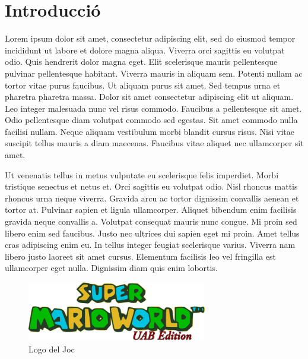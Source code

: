 \section{Introducció}\label{sec:intro}


Lorem ipsum dolor sit amet, consectetur adipiscing elit, sed do eiusmod tempor incididunt ut labore et dolore magna aliqua. Viverra orci sagittis eu volutpat odio. Quis hendrerit dolor magna eget. Elit scelerisque mauris pellentesque pulvinar pellentesque habitant. Viverra mauris in aliquam sem. Potenti nullam ac tortor vitae purus faucibus. Ut aliquam purus sit amet. Sed tempus urna et pharetra pharetra massa. Dolor sit amet consectetur adipiscing elit ut aliquam. Leo integer malesuada nunc vel risus commodo. Faucibus a pellentesque sit amet. Odio pellentesque diam volutpat commodo sed egestas. Sit amet commodo nulla facilisi nullam. Neque aliquam vestibulum morbi blandit cursus risus. Nisi vitae suscipit tellus mauris a diam maecenas. Faucibus vitae aliquet nec ullamcorper sit amet.

Ut venenatis tellus in metus vulputate eu scelerisque felis
imperdiet. Morbi tristique senectus et netus et. Orci sagittis eu
volutpat odio. Nisl rhoncus mattis rhoncus urna neque viverra. Gravida
arcu ac tortor dignissim convallis aenean et tortor at. Pulvinar
sapien et ligula ullamcorper. Aliquet bibendum enim facilisis gravida
neque convallis a. Volutpat consequat mauris nunc congue. Mi proin sed
libero enim sed faucibus. Justo nec ultrices dui sapien eget mi
proin. Amet tellus cras adipiscing enim eu. In tellus integer feugiat
scelerisque varius. Viverra nam libero justo laoreet sit amet
cursus. Elementum facilisis leo vel fringilla est ullamcorper eget
nulla. Dignissim diam quis enim lobortis.

\begin{figure}[ht]
  \centering
  \includegraphics[width=0.7\textwidth]{./imatges/gamelogo.png}
  \caption{Logo del Joc}
  \label{fig:gamelogo}
\end{figure}

